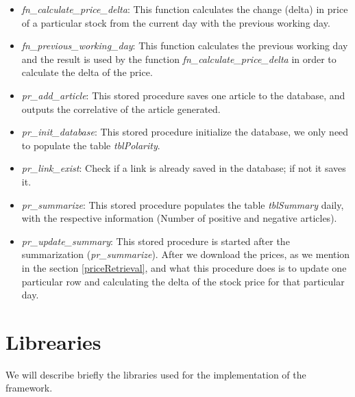 \begin{itemize}
	\item \emph{fn\_calculate\_price\_delta}: This function calculates the change (delta) in price of a particular stock from the current day with the previous working day.
	\item \emph{fn\_previous\_working\_day}: This function calculates the previous working day and the result is used by the function \emph{fn\_calculate\_price\_delta} in order to calculate the delta of the price.
	\item \emph{pr\_add\_article}: This stored procedure saves one article to the database, and outputs the correlative of the article generated.
	\item \emph{pr\_init\_database}: This stored procedure initialize the database, we only need to populate the table \emph{tblPolarity}.
	\item \emph{pr\_link\_exist}: Check if a link is already saved in the database; if not it saves it.
	\item \emph{pr\_summarize}: This stored procedure populates the table \emph{tblSummary} daily, with the respective information (Number of positive and negative articles).
	\item \emph{pr\_update\_summary}: This stored procedure is started after the summarization (\emph{pr\_summarize}). After we download the prices, as we mention in the section \ref{priceRetrieval}, and what this procedure does is to update one particular row and calculating the delta of the stock price for that particular day.
\end{itemize}

\section{Librearies}
We will describe briefly the libraries used for the implementation of the framework. 

